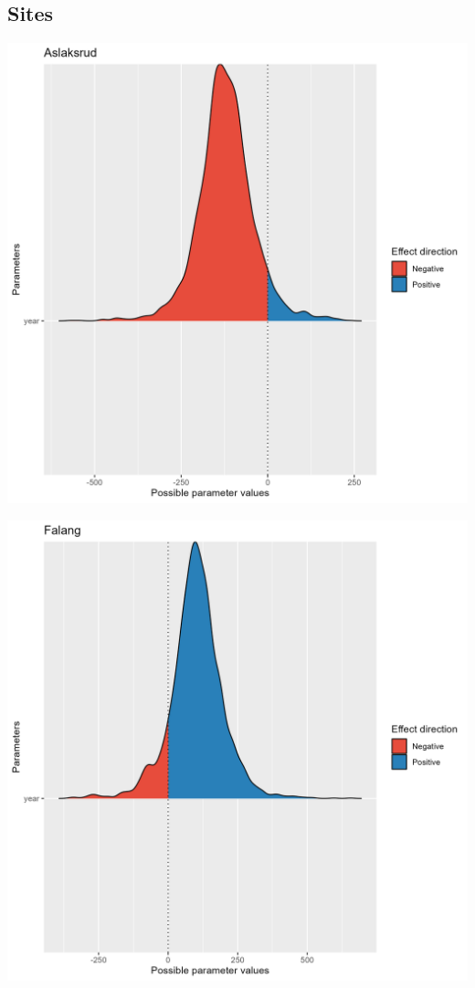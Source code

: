 \documentclass[
  letterpaper,
  DIV=11,
  numbers=noendperiod]{scrreport}
\begin{document}
\hypertarget{sites}{%
\subsection{Sites}\label{sites}}

\includegraphics{data/derived_data/direction_plots/plots/Aslaksrud.png}

\includegraphics{data/derived_data/direction_plots/plots/Falang.png}
\end{document}
